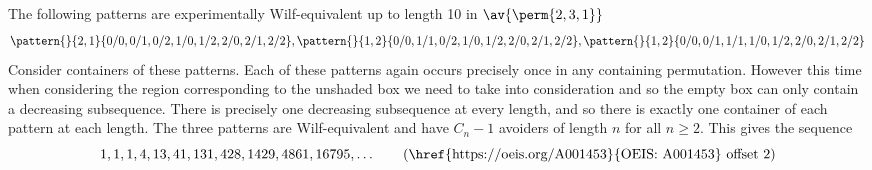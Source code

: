 \subsection{}
The following patterns are experimentally Wilf-equivalent up to length 10 in
\(\av{\perm{2,3,1}}\)
\begin{equation*}
    \pattern{}{2,1}{0/0,0/1,0/2,1/0,1/2,2/0,2/1,2/2},
    \pattern{}{1,2}{0/0,1/1,0/2,1/0,1/2,2/0,2/1,2/2},
    \pattern{}{1,2}{0/0,0/1,1/1,1/0,1/2,2/0,2/1,2/2}
\end{equation*}
Consider containers of these patterns.
Each of these patterns again occurs precisely once in
any containing permutation. However this time when considering
the region corresponding to the unshaded box we need to take into consideration
and so the empty box can only contain a decreasing subsequence. There
is precisely one decreasing subsequence at every length, and so there
is exactly one container of each pattern at each length. The three
patterns are Wilf-equivalent and have \(C_n - 1\) avoiders of
length \(n\) for all \(n \ge 2\).
This gives the sequence
\begin{equation*}
    1, 1, 1, 4, 13, 41, 131, 428, 1429, 4861, 16795,\dotsc\tag{\href{https://oeis.org/A001453}{OEIS: A001453} offset 2}
\end{equation*}


